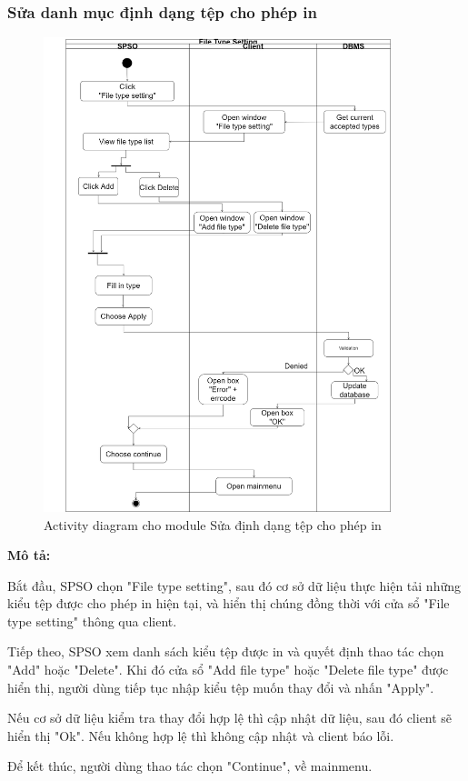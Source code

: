\subsubsection{Sửa danh mục định dạng tệp cho phép in}
\begin{figure}[H]
    \begin{center}
        \includegraphics[width=0.9\textwidth]{Images/System Modelling/FileTypeSetting_Activity.png}
        \caption{Activity diagram cho module Sửa định dạng tệp cho phép in}
        \label{fig:arch}
    \end{center}
\end{figure}

\textbf{Mô tả:}\par
Bắt đầu, SPSO chọn "File type setting", sau đó cơ sở dữ liệu thực hiện tải những kiểu tệp được cho phép in hiện tại, và hiển thị chúng đồng thời với cửa sổ "File type setting" thông qua client. \par
Tiếp theo, SPSO xem danh sách kiểu tệp được in và quyết định thao tác chọn "Add" hoặc "Delete". Khi đó cửa sổ "Add file type" hoặc "Delete file type" được hiển thị, người dùng tiếp tục nhập kiểu tệp muốn thay đổi và nhấn "Apply".\par
Nếu cơ sở dữ liệu kiểm tra thay đổi hợp lệ thì cập nhật dữ liệu, sau đó client sẽ hiển thị "Ok". Nếu không hợp lệ thì không cập nhật và client báo lỗi.\par
Để kết thúc, người dùng thao tác chọn "Continue", về mainmenu.


